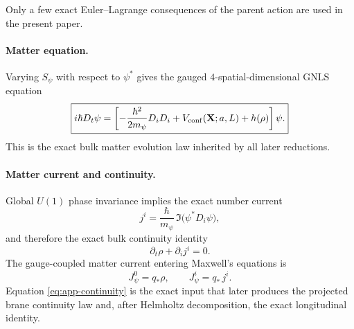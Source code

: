\documentclass[11pt]{article}
\newcommand{\qstar}{q_*}
\begin{document}
Only a few exact Euler--Lagrange consequences of the parent action are used in the present
paper.

\paragraph{Matter equation.}
Varying \(S_\psi\) with respect to \(\psi^*\) gives the gauged \(4\)-spatial-dimensional
GNLS equation
\begin{equation}
\boxed{
i\hbar D_t\psi
=
\left[
-\frac{\hbar^2}{2m_\psi}D_iD_i
+
V_{\rm conf}(\mathbf X;a,L)
+
h(\rho)
\right]\psi.
}
\label{eq:app-gnls}
\end{equation}
This is the exact bulk matter evolution law inherited by all later reductions.

\paragraph{Matter current and continuity.}
Global \(U(1)\) phase invariance implies the exact number current
\begin{equation}
j^i
=
\frac{\hbar}{m_\psi}\,\Im\!\bigl(\psi^*D_i\psi\bigr),
\label{eq:app-current}
\end{equation}
and therefore the exact bulk continuity identity
\begin{equation}
\boxed{
\partial_t\rho+\partial_i j^i=0.
}
\label{eq:app-continuity}
\end{equation}
The gauge-coupled matter current entering Maxwell's equations is
\begin{equation}
J_\psi^0 = \qstar\rho,
\qquad
J_\psi^i = \qstar\,j^i.
\label{eq:app-gauge-current}
\end{equation}
Equation \eqref{eq:app-continuity} is the exact input that later produces the projected
brane continuity law and, after Helmholtz decomposition, the exact longitudinal identity.
\end{document}
